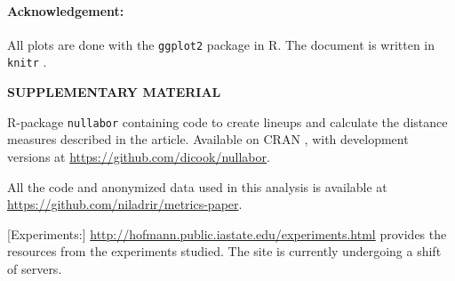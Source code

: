 \documentclass[12pt]{article}\usepackage[]{graphicx}\usepackage[]{color}
\newcommand{\dc}[1]{{\color{orange} #1}}
\begin{document}
%
%

\paragraph{Acknowledgement:}

 All plots are done with the {\tt ggplot2} \citep{hadley:2009} package in R. The document is written in {\tt knitr} \citep{xie:2015}.

\begin{center}
{\large\bf SUPPLEMENTARY MATERIAL}
\end{center}

\begin{description}

\item[Software:] R-package {\tt nullabor} containing code to create lineups and calculate the distance measures described in the article.  Available on CRAN \citep{CRAN}, with development versions at \url{https://github.com/dicook/nullabor}. 
\item[Reproducibility:] All the code and anonymized data used in this analysis is available at \url{https://github.com/niladrir/metrics-paper}.
\item \dc{[Experiments:] \url{http://hofmann.public.iastate.edu/experiments.html} provides the resources from the experiments studied. The site is currently undergoing a shift of servers.}  

\end{description}
\end{document}
